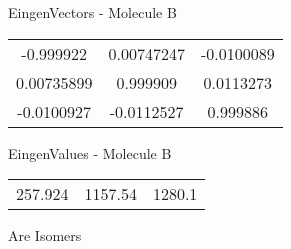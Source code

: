 \begin{multicols}{2}
\begin{center}
\vtab
 EingenVectors - Molecule B     \\
\vtab
\begin{tabular}{|c c c|}
-0.999922	 & 	0.00747247	 & 	-0.0100089	 \\
0.00735899	 & 	0.999909	 & 	0.0113273	 \\
-0.0100927	 & 	-0.0112527	 & 	0.999886
\end{tabular}

\vtab
 EingenValues - Molecule B     \\
\vtab
\begin{tabular}{|c c c|}
257.924	 & 	1157.54	 & 	1280.1
\end{tabular}

\end{center}
\end{multicols}
\begin{center}
\vtab
\vtab
\textcolor{NavyBlue}{\Large Are Isomers}
\end{center}
\newpage

